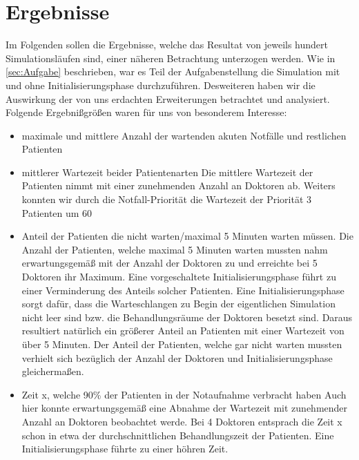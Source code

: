 \documentclass[12pt,fleqn,a4paper]{article}
\begin{document}
\section{Ergebnisse}
Im Folgenden sollen die Ergebnisse, welche das Resultat von jeweils hundert Simulationsl\"{a}ufen sind, einer n\"{a}heren Betrachtung unterzogen werden.
Wie in \ref{sec:Aufgabe} beschrieben, war es Teil der Aufgabenstellung die Simulation mit und ohne Initialisierungsphase durchzuf\"{u}hren.
Desweiteren haben wir die Auswirkung  der von uns erdachten Erweiterungen betrachtet und analysiert.
Folgende Ergebni{\ss}gr\"{o}{\ss}en waren f\"{u}r uns von besonderem Interesse:
\begin{itemize}
	\item maximale und mittlere Anzahl der wartenden akuten 	Notf\"{a}lle und restlichen Patienten 
	\item mittlerer Wartezeit beider Patientenarten\newline
	Die mittlere Wartezeit der Patienten nimmt mit einer zunehmenden Anzahl an Doktoren ab.
	Weiters konnten wir durch die Notfall-Priorit\"{a}t die Wartezeit der Priorit\"{a}t 3 Patienten um 60 %
	\item Anteil der Patienten die nicht warten/maximal 5 Minuten warten m\"{u}ssen.\newline
	Die Anzahl der Patienten, welche maximal 5 Minuten warten mussten nahm erwartungsgem\"{a}{\ss} mit der Anzahl der Doktoren zu und erreichte bei 5 Doktoren ihr Maximum. Eine vorgeschaltete Initialisierungsphase f\"{u}hrt zu einer Verminderung des Anteils solcher Patienten.
Eine Initialisierungsphase sorgt daf\"{u}r, dass die Warteschlangen zu Begin der eigentlichen Simulation nicht leer sind bzw.
 die Behandlungsr\"{a}ume der Doktoren besetzt sind. Daraus resultiert nat\"{u}rlich ein gr\"{o}{\ss}erer Anteil an Patienten mit einer Wartezeit von \"{u}ber 5 Minuten. 
	Der Anteil der Patienten, welche gar nicht warten mussten verhielt sich bez\"{u}glich der Anzahl der Doktoren und Initialisierungsphase gleicherma{\ss}en.

	\item Zeit x, welche 90\% der Patienten in der Notaufnahme verbracht haben
	Auch hier konnte erwartungsgem\"{a}{\ss} eine Abnahme der Wartezeit mit zunehmender Anzahl an Doktoren beobachtet werde. Bei 4 Doktoren entsprach die Zeit x schon in etwa der durchschnittlichen Behandlungszeit der Patienten. 
Eine Initialisierungsphase f\"{u}hrte zu einer h\"{o}hren Zeit.
\end{itemize}





\newpage
%
%
\end{document}
